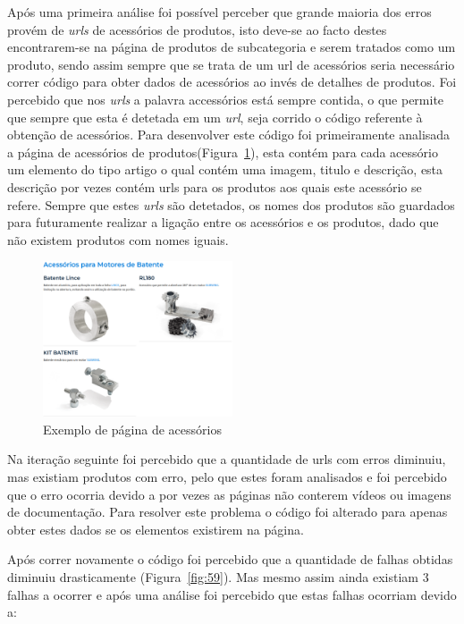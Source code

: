 Após uma primeira análise foi possível perceber que grande maioria dos erros provém de \textit{urls} de acessórios de produtos, isto deve-se ao facto destes encontrarem-se na página de produtos de subcategoria e serem tratados como um produto, sendo assim sempre que se trata de um url de acessórios seria necessário correr código para obter dados de acessórios ao invés de detalhes de produtos. Foi percebido que nos \textit{urls} a palavra accessórios está sempre contida, o que permite que sempre que esta é detetada em um \textit{url}, seja corrido o código referente à obtenção de acessórios. Para desenvolver este código foi primeiramente analisada a página de acessórios de produtos(Figura~\ref*{fig:58}), esta contém para cada acessório um elemento do tipo artigo o qual contém uma imagem, titulo e descrição, esta descrição por vezes contém urls para os produtos aos quais este acessório se refere. Sempre que estes \textit{urls} são detetados, os nomes dos produtos são guardados para futuramente realizar a ligação entre os acessórios e os produtos, dado que não existem produtos com nomes iguais. 

\begin{figure}[htb]
    \centering
    
    \includegraphics[width=0.5\textwidth]{images/implementacao/scraper/pagina_acessorios.png}
    \caption{Exemplo de página de acessórios}
    \label{fig:58}
\end{figure}

\newpage

Na iteração seguinte foi percebido que a quantidade de urls com erros diminuiu, mas existiam produtos com erro, pelo que estes foram analisados e foi percebido que o erro ocorria devido a por vezes as páginas não conterem vídeos ou imagens de documentação. Para resolver este problema o código foi alterado para apenas obter estes dados se os elementos existirem na página. 

Após correr novamente o código foi percebido que a quantidade de falhas obtidas diminuiu drasticamente (Figura~\ref{fig:59}). Mas mesmo assim ainda existiam 3 falhas a ocorrer e após uma análise foi percebido que estas falhas ocorriam devido a:

